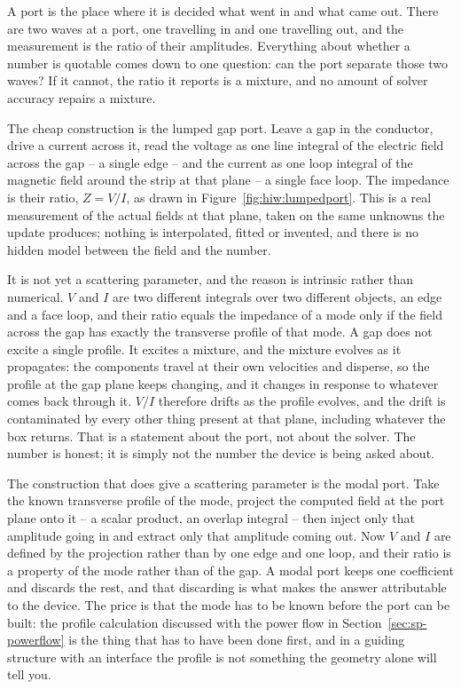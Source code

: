 A port is the place where it is decided what went in and what came out. There are two waves at a port, one
travelling in and one travelling out, and the measurement is the ratio of their amplitudes. Everything about
whether a number is quotable comes down to one question: can the port separate those two waves? If it cannot,
the ratio it reports is a mixture, and no amount of solver accuracy repairs a mixture.

The cheap construction is the lumped gap port. Leave a gap in the conductor, drive a current across it, read
the voltage as one line integral of the electric field across the gap -- a single edge -- and the current as
one loop integral of the magnetic field around the strip at that plane -- a single face loop. The impedance is
their ratio, $Z=V/I$, as drawn in Figure~\ref{fig:hiw:lumpedport}. This is a real measurement of the actual
fields at that plane, taken on the same unknowns the update produces; nothing is interpolated, fitted or
invented, and there is no hidden model between the field and the number.

It is not yet a scattering parameter, and the reason is intrinsic rather than numerical. $V$ and $I$ are two
different integrals over two different objects, an edge and a face loop, and their ratio equals the impedance
of a mode only if the field across the gap has exactly the transverse profile of that mode. A gap does not
excite a single profile. It excites a mixture, and the mixture evolves as it propagates: the components travel
at their own velocities and disperse, so the profile at the gap plane keeps changing, and it changes in
response to whatever comes back through it. $V/I$ therefore drifts as the profile evolves, and the drift is
contaminated by every other thing present at that plane, including whatever the box returns. That is a
statement about the port, not about the solver. The number is honest; it is simply not the number the device
is being asked about.

The construction that does give a scattering parameter is the modal port. Take the known transverse profile of
the mode, project the computed field at the port plane onto it -- a scalar product, an overlap integral -- then
inject only that amplitude going in and extract only that amplitude coming out. Now $V$ and $I$ are defined by
the projection rather than by one edge and one loop, and their ratio is a property of the mode rather than of
the gap. A modal port keeps one coefficient and discards the rest, and that discarding is what makes the
answer attributable to the device. The price is that the mode has to be known before the port can be built:
the profile calculation discussed with the power flow in Section~\ref{sec:sp-powerflow} is the thing that has
to have been done first, and in a guiding structure with an interface the profile is not something the
geometry alone will tell you.

